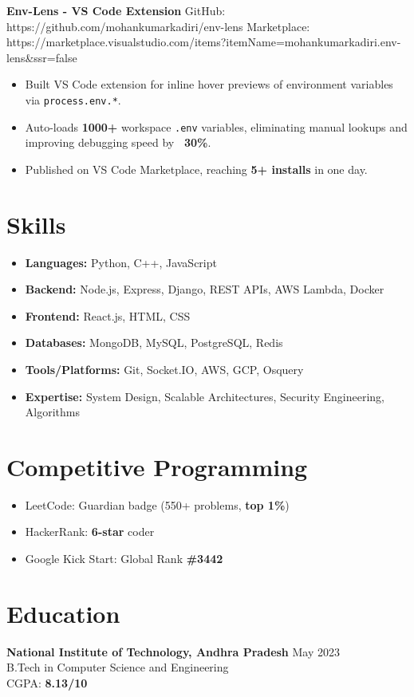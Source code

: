 \documentclass[a4paper,10pt]{article}
\newcommand{\resumeItem}[1]{\item\small{#1}}
\begin{document}
\vspace{6pt}

\textbf{Env-Lens - VS Code Extension} \hfill
GitHub: https://github.com/mohankumarkadiri/env-lens \textbar{} Marketplace: https://marketplace.visualstudio.com/items?itemName=mohankumarkadiri.env-lens&ssr=false
\vspace{3pt}
\begin{itemize}[leftmargin=*,itemsep=2pt]
  \resumeItem{Built VS Code extension for inline hover previews of environment variables via \texttt{process.env.*}.}
  \resumeItem{Auto-loads \textbf{1000+} workspace \texttt{.env} variables, eliminating manual lookups and improving debugging speed by \textbf{~30\%}.}
  \resumeItem{Published on VS Code Marketplace, reaching \textbf{5+ installs} in one day.}
\end{itemize}

\section*{Skills}
\begin{itemize}[leftmargin=*,itemsep=2pt]
  \resumeItem{\textbf{Languages:} Python, C++, JavaScript}
  \resumeItem{\textbf{Backend:} Node.js, Express, Django, REST APIs, AWS Lambda, Docker}
  \resumeItem{\textbf{Frontend:} React.js, HTML, CSS}
  \resumeItem{\textbf{Databases:} MongoDB, MySQL, PostgreSQL, Redis}
  \resumeItem{\textbf{Tools/Platforms:} Git, Socket.IO, AWS, GCP, Osquery}
  \resumeItem{\textbf{Expertise:} System Design, Scalable Architectures, Security Engineering, Algorithms}
\end{itemize}

\section*{Competitive Programming}
\begin{itemize}[leftmargin=*,itemsep=2pt]
  \resumeItem{LeetCode: Guardian badge (550+ problems, \textbf{top 1\%})}  
  \resumeItem{HackerRank: \textbf{6-star} coder}  
  \resumeItem{Google Kick Start: Global Rank \textbf{\#3442}}
\end{itemize}

\section*{Education}
\textbf{National Institute of Technology, Andhra Pradesh} \hfill May 2023\\
B.Tech in Computer Science and Engineering\\
CGPA: \textbf{8.13/10}
\end{document}
